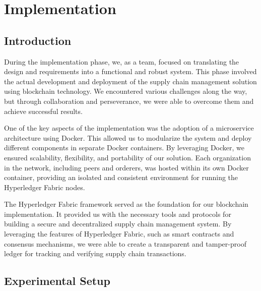 
\chapter{Implementation}\doublespacing %

\label{Chapter6} %


\section{Introduction}
During the implementation phase, we, as a team, focused on translating the design and requirements into a functional and robust system. This phase involved the actual development and deployment of the supply chain management solution using blockchain technology. We encountered various challenges along the way, but through collaboration and perseverance, we were able to overcome them and achieve successful results.
\par One of the key aspects of the implementation was the adoption of a microservice architecture using Docker. This allowed us to modularize the system and deploy different components in separate Docker containers. By leveraging Docker, we ensured scalability, flexibility, and portability of our solution. Each organization in the network, including peers and orderers, was hosted within its own Docker container, providing an isolated and consistent environment for running the Hyperledger Fabric nodes.
\par The Hyperledger Fabric framework served as the foundation for our blockchain implementation. It provided us with the necessary tools and protocols for building a secure and decentralized supply chain management system. By leveraging the features of Hyperledger Fabric, such as smart contracts and consensus mechanisms, we were able to create a transparent and tamper-proof ledger for tracking and verifying supply chain transactions.



\section{ Experimental Setup}

